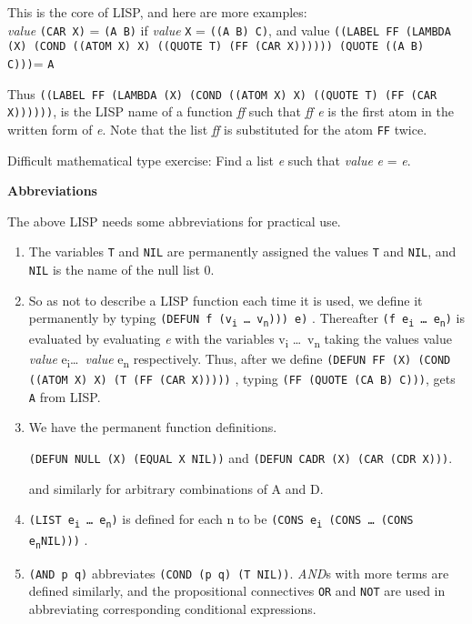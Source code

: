 \documentclass[10pt,a4paper,twocolumn]{article}
\newcommand{\args}[1] {#1\textsubscript{i} \dots \ #1\textsubscript{n}}
\newcommand{\ei}[0] {e\textsubscript{i}}
\newcommand{\en}[0] {e\textsubscript{n}}
\begin{document}
This is the core of LISP, and here are more examples:  \\

\textit{value} \texttt{(CAR X)} = \texttt{(A B)} if \textit{value} \texttt{X} =
\texttt{((A B) C)}, and value \texttt{((LABEL FF (LAMBDA (X) (COND ((ATOM X) X)
  ((QUOTE T) (FF (CAR X)))))) (QUOTE ((A B) C)))}= \texttt{A}

Thus \texttt{((LABEL FF (LAMBDA (X) (COND ((ATOM X) X) ((QUOTE T) (FF (CAR
  X))))))}, is the LISP name of a function \textit{ff} such that \textit{ff e}
is the first atom in the written form of \textit{e}. Note that the list
\textit{ff} is substituted for the atom \texttt{FF} twice.

Difficult mathematical type exercise: Find a list \textit{e} such that
\textit{value} \textit{e} = \textit{e}.

\vspace*{1\baselineskip}
\textbf{Abbreviations}
\vspace*{1\baselineskip}

The above LISP needs some abbreviations for practical use.

\begin{enumerate}

\item The variables \texttt{T} and \texttt{NIL} are permanently assigned the
  values \texttt{T} and \texttt{NIL}, and \texttt{NIL} is the name of the null
  list 0.

\item So as not to describe a LISP function each time it is used, we define it
  permanently by typing \texttt{(DEFUN f (\args{v}))) e)} . Thereafter
  \texttt{(f \args{e})} is evaluated by evaluating \textit{e} with the variables
  \args{v} taking the values value \textit{value} \ei \dots \ \textit{value} \en
  respectively. Thus, after we define \texttt{(DEFUN FF (X) (COND ((ATOM X) X)
    (T (FF (CAR X)))))} , typing \texttt{(FF (QUOTE (CA B) C)))}, gets
  \texttt{A} from LISP.

\item We have the permanent function definitions.

  \texttt{(DEFUN NULL (X) (EQUAL X NIL))} and \texttt{(DEFUN CADR (X) (CAR (CDR
    X)))}.

  and similarly for arbitrary combinations of A and D.

\item \texttt{(LIST \args{e})} is defined for each n to be \texttt{(CONS \ei
    (CONS \dots \ (CONS \en NIL)))} .

\item \texttt{(AND p q)} abbreviates \texttt{(COND (p q) (T NIL))}.
  \textit{AND}s with more terms are defined similarly, and the propositional
  connectives \texttt{OR} and \texttt{NOT} are used in abbreviating
  corresponding conditional expressions.

\end{enumerate}
\end{document}
